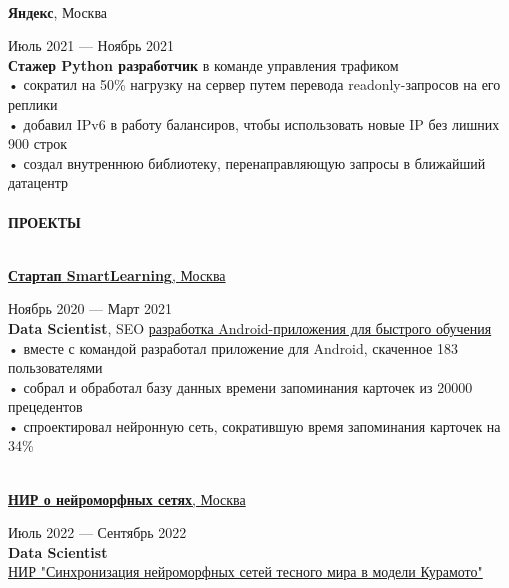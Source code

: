\documentclass{article}
\begin{document}
\begin{vwcol}[widths={0.8,0.2},
 sep=.8cm, justify=flush,rule=0pt,indent=1em]
\\
\begin{Large}
\textbf{Яндекс}, Москва
\end{Large}
\hspace{190pt}Июль 2021 — Ноябрь 2021\\
\textbf{Стажер Python разработчик} в команде управления трафиком\\
• сократил на 50\% нагрузку на сервер путем перевода readonly-запросов на его реплики\\
• добавил IPv6 в работу балансиров, чтобы использовать новые IP без лишних 900 строк\\
• создал внутреннюю библиотеку, перенаправляющую запросы в ближайший датацентр\\
\\
\noindent\textcolor[rgb]{0.1255,0.2902,0.7843}{\textbf{\Large{ПРОЕКТЫ}}}\\
\\
\begin{Large}
\href{https://www.canva.com/design/DAEaT9nPC7Y/y7_r2BzUEiUiFKW36oP-Pw/view?utm_content=DAEaT9nPC7Y&utm_campaign=designshare&utm_medium=link&utm_source=publishsharelink}{\textbf{Стартап SmartLearning}, Москва}
\end{Large}
\hspace{75pt}Ноябрь 2020 — Март 2021\\
\textbf{Data Scientist}, SEO \href{https://gitlab.com/peganov.nik/smartlearning}{разработка Android-приложения для быстрого обучения}\\
• вместе с командой разработал приложение для Android, скаченное 183 пользователями\\
• собрал и обработал базу данных времени запоминания карточек из 20000 прецедентов\\
• спроектировал нейронную сеть, сократившую время запоминания карточек на 34\%\\
\\
\begin{Large}
\href{https://github.com/NikPeg/synchronization-of-neuromorphic-networks-of-the-close-world-from-the-point-of-view-of-complexes}{\textbf{НИР о нейроморфных сетях}, Москва}
\end{Large}
\hspace{25pt}Июль 2022 — Сентябрь 2022\\
\textbf{Data Scientist}\\
\href{https://github.com/NikPeg/synchronization-of-neuromorphic-networks-of-the-close-world-from-the-point-of-view-of-complexes}{НИР "Синхронизация нейроморфных сетей тесного мира в модели Курамото"}\\

\end{vwcol}
\end{document}
